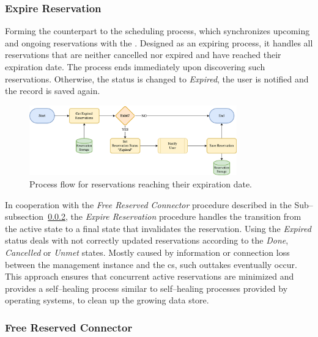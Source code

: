 \subsubsection{Expire Reservation}
\label{ch:Design:sec:Reservation System:ssec:Scheduling Capabilities:sssec:Expire Reservation}

Forming the counterpart to the scheduling process, which synchronizes upcoming and ongoing reservations with the . Designed as an expiring process, it handles all reservations that are neither cancelled nor expired and have reached their expiration date.
The process ends immediately upon discovering such reservations. Otherwise, the status is changed to \textit{Expired}, the user is notified and the record is saved again.

\begin{figure}[h]
    \centering
    \includegraphics[width=0.8\textwidth,keepaspectratio]{resources/images/main/5_design/processes/scheduler/UpdateExpiredReservations.png}
    \caption{Process flow for reservations reaching their expiration date.}
    \label{fig:expire-reservation-flowchart}
\end{figure}

\noindent In cooperation with the \textit{Free Reserved Connector} procedure described in the Sub--subsection~\ref{ch:Design:sec:Reservation System:ssec:Scheduling Capabilities:sssec:Free Reserved Connector}, the \textit{Expire Reservation} procedure handles the transition from the active state to a final state that invalidates the reservation.
Using the \textit{Expired} status deals with not correctly updated reservations according to the \textit{Done}, \textit{Cancelled} or \textit{Unmet} states.
Mostly caused by information or connection loss between the management instance and the \acrshort{cs}, such outtakes eventually occur.
This approach ensures that concurrent active reservations are minimized and provides a self--healing process similar to self--healing processes provided by operating systems, to clean up the growing data store.

\subsubsection{Free Reserved Connector}
\label{ch:Design:sec:Reservation System:ssec:Scheduling Capabilities:sssec:Free Reserved Connector}

